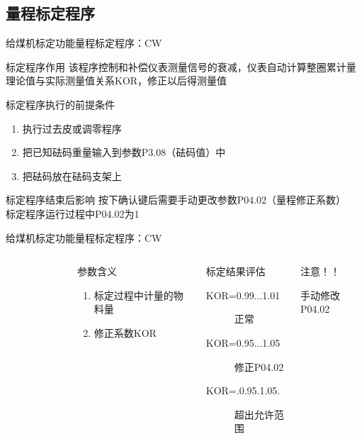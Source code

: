 \documentclass[12pt,hyperref={CJKbookmarks=true}]{beamer} %
\begin{document}
\subsection{量程标定程序}
\begin{frame}{给煤机标定功能}{量程标定程序：CW}
\begin{block}{标定程序作用}
  		该程序控制和补偿仪表测量信号的衰减，仪表自动计算整圈累计量理论值与实际测量值关系KOR，修正以后得测量值
\end{block}
\begin{exampleblock}{标定程序执行的前提条件}
  		\begin{enumerate}
				\item 执行过去皮或调零程序
				
				\item  把已知砝码重量输入到参数P3.08（砝码值）中
				
				\item   把砝码放在砝码支架上		
			\end{enumerate}
\end{exampleblock}
\begin{alertblock}{标定程序结束后影响}
  		按下确认键后需要手动更改参数P04.02（量程修正系数）\\
标定程序运行过程中P04.02为1
\end{alertblock}
	\end{frame}
\begin{frame}{给煤机标定功能}{量程标定程序：CW}
  		\begin{columns}
\begin{figure}
	
\end{figure}
\begin{block}{参数含义}
			\begin{enumerate}
				\item 标定过程中计量的物料量
				\item  修正系数KOR
				\end{enumerate}
\end{block}
\begin{exampleblock}{标定结果评估}
			\begin{description}
				\item[KOR=0.99...1.01]正常
				\item[KOR=0.95...1.05]修正P04.02
				\item[KOR=.0.95.1.05.]超出允许范围
				\end{description}
\end{exampleblock}
\begin{alertblock}{注意！！}
			
				手动修改P04.02
\end{alertblock}
		\end{columns}
	\end{frame}
\end{document}

